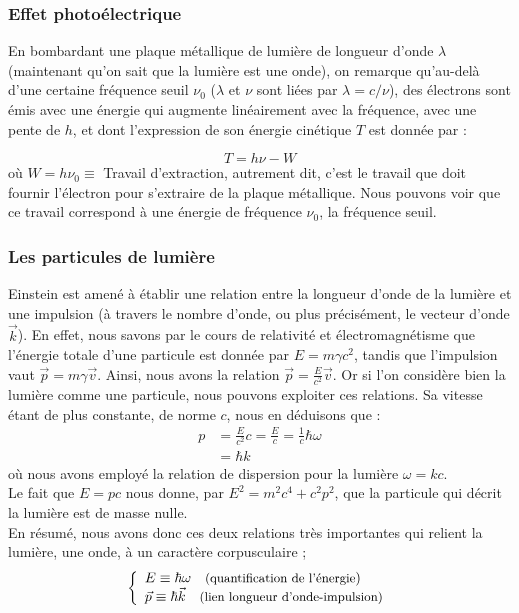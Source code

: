 \documentclass[../notesdecours]{subfiles}
\begin{document}
\subsubsection{Effet photoélectrique}
En bombardant une plaque métallique de lumière de longueur d'onde $\lambda$ (maintenant qu'on sait que la lumière est une onde), on remarque qu'au-delà d'une certaine fréquence seuil $\nu_0$ ($\lambda$ et $\nu$ sont liées par $\lambda = c/\nu$), des électrons sont émis avec une énergie qui augmente linéairement avec la fréquence, avec une pente de $h$, et dont l'expression de son énergie cinétique $T$ est donnée par :

$$ T = h\nu - W$$
où $W = h \nu_0 \equiv$ Travail d'extraction, autrement dit, c'est le travail que doit fournir l'électron pour s'extraire de la plaque métallique. Nous pouvons voir que ce travail correspond à une énergie de fréquence $\nu_0$, la fréquence seuil. 

\subsubsection{Les particules de lumière}
Einstein est amené à établir une relation entre la longueur d'onde de la lumière et une impulsion (à travers le nombre d'onde, ou plus précisément, le vecteur d'onde $\vec{k}$).
En effet, nous savons par le cours de relativité et électromagnétisme que l'énergie totale d'une particule est donnée par $E = m \gamma c^2$, tandis que l'impulsion vaut $\vec{p} = m \gamma \vec{v}$. Ainsi, nous avons la relation $\vec{p} = \frac{E}{c^2} \vec{v}$. 
Or si l'on considère bien la lumière comme une particule, nous pouvons exploiter ces relations. Sa vitesse étant de plus constante, de norme $c$, nous en déduisons que : 
\begin{align*}
  p &= \frac{E}{c^2} c = \frac{E}{c} = \frac{1}{c} \hbar \omega \\
  &= \hbar k 
\end{align*}
où nous avons employé la relation de dispersion pour la lumière $\omega = kc$. \\
Le fait que $E = pc$ nous donne, par $E^2 = m^2 c^4 + c^2 p^2$, que la particule qui décrit la lumière est de masse nulle. \\
En résumé, nous avons donc ces deux relations très importantes qui relient la lumière, une onde, à un caractère corpusculaire ; 
\begin{align}
\label{Quantification energie et impulsion}
\left\{ \begin{array}{l}
E \equiv \hbar \omega \quad \text{\small (quantification de l'énergie}) \\
\vec{p} \equiv \hbar \vec{k}  \quad \text{\small (lien longueur d'onde-impulsion)}
\end{array} \right.
\end{align}
\end{document}
